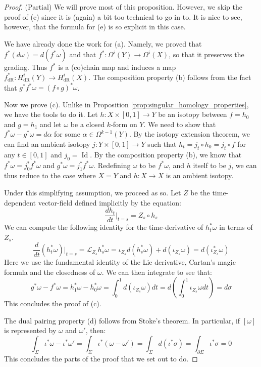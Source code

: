\documentclass[12pt]{article}
\theoremstyle{definition}
\numberwithin{equation}{section}
\newcommand{\op}{\operatorname}
\begin{document}
\begin{proof} (Partial) We will prove most of this proposition. However, we skip the proof of (e) since it is (again) a bit too technical to go in to. It is nice to see, however, that the formula for (e) is so explicit in this case.

We have already done the work for (a). Namely, we proved that $f^*(d\omega) = d(f^*\omega)$ and that $f^*:\Omega^i(Y) \to \Omega^i(X)$, so that it preserves the grading. Thus $f^*$ is a (co)chain map and induces a map $f^*_{\op{dR}}:H^i_{\op{dR}}(Y) \to H^i_{\op{dR}}(X)$. The composition property (b) follows from the fact that $g^*f^*\omega = (f \circ g)^*\omega$. 

Now we prove (c). Unlike in Proposition \ref{prop:singular_homology_properties}, we have the tools to do it. Let $h:X \times [0,1] \to Y$ be an isotopy between $f = h_0$ and $g = h_1$ and let $\omega$ be a closed $k$-form on $Y$. We need to show that $f^*\omega - g^*\omega = d\alpha$ for some $\alpha \in \Omega^{k-1}(Y)$. By the isotopy extension theorem, we can find an ambient isotopy $j:Y \times [0,1] \to Y$ such that $h_t = j_t \circ h_0 = j_t \circ f$ for any $t \in [0,1]$ and $j_0 = \op{Id}$. By the composition property (b), we know that $f^*\omega = j_0^*f^*\omega$ and $g^*\omega = j_1^*f^*\omega$. Redefining $\omega$ to be $f^*\omega$, and $h$ itself to be $j$, we can thus reduce to the case where $X = Y$ and $h:X \to X$ is an ambient isotopy.

Under this simplifying assumption, we proceed as so. Let $Z$ be the time-dependent vector-field defined implicitly by the equation:
\[
\frac{dh_t}{dt}|_{t = s} = Z_s \circ h_s
\]
We can compute the following identity for the time-derivative of $h^*_t\omega$ in terms of $Z_s$.
\[
\frac{d}{dt}(h_t^*\omega)|_{t = s} = \mathcal{L}_{Z_s}h^*_s\omega = \iota_{Z_s}d(h^*_s\omega) + d(\iota_{Z_s}\omega)  = d(\iota^*_{Z_s}\omega)
\]
Here we use the fundamental identity of the Lie derivative, Cartan's magic formula and the closedness of $\omega$. We can then integrate to see that:
\[
g^*\omega - f^*\omega = h_1^*\omega - h^*_0\omega = \int_0^1 d(\iota_{Z_s}\omega) dt = d(\int_0^1 \iota_{Z_s}\omega dt) = d\sigma
\]
This concludes the proof of (c).

The dual pairing property (d) follows from Stoke's theorem. In particular, if $[\omega]$ is represented by $\omega$ and $\omega'$, then:
\[
\int_\Sigma \iota^*\omega - \iota^*\omega' = \int_\Sigma \iota^*(\omega - \omega') = \int_\Sigma d(\iota^*\sigma) = \int_{\partial \Sigma} \iota^*\sigma = 0
\]
This concludes the parts of the proof that we set out to do. \end{proof}
\end{document}
